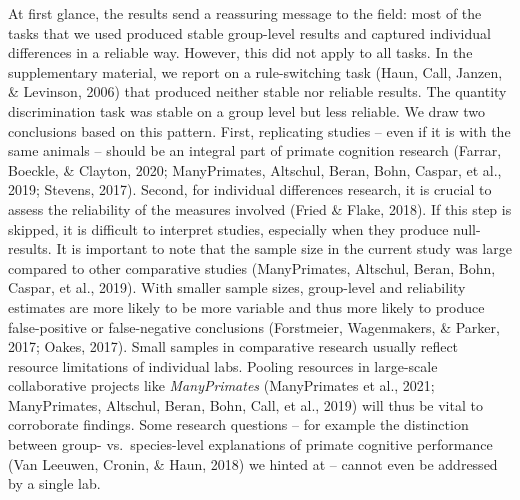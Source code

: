 \documentclass[
  man,floatsintext]{apa6}
\begin{document}
At first glance, the results send a reassuring message to the field: most of the tasks that we used produced stable group-level results and captured individual differences in a reliable way. However, this did not apply to all tasks. In the supplementary material, we report on a rule-switching task (Haun, Call, Janzen, \& Levinson, 2006) that produced neither stable nor reliable results. The quantity discrimination task was stable on a group level but less reliable. We draw two conclusions based on this pattern. First, replicating studies -- even if it is with the same animals -- should be an integral part of primate cognition research (Farrar, Boeckle, \& Clayton, 2020; ManyPrimates, Altschul, Beran, Bohn, Caspar, et al., 2019; Stevens, 2017). Second, for individual differences research, it is crucial to assess the reliability of the measures involved (Fried \& Flake, 2018). If this step is skipped, it is difficult to interpret studies, especially when they produce null-results. It is important to note that the sample size in the current study was large compared to other comparative studies (ManyPrimates, Altschul, Beran, Bohn, Caspar, et al., 2019). With smaller sample sizes, group-level and reliability estimates are more likely to be more variable and thus more likely to produce false-positive or false-negative conclusions (Forstmeier, Wagenmakers, \& Parker, 2017; Oakes, 2017). Small samples in comparative research usually reflect resource limitations of individual labs. Pooling resources in large-scale collaborative projects like \emph{ManyPrimates} (ManyPrimates et al., 2021; ManyPrimates, Altschul, Beran, Bohn, Call, et al., 2019) will thus be vital to corroborate findings. Some research questions -- for example the distinction between group- vs.~species-level explanations of primate cognitive performance (Van Leeuwen, Cronin, \& Haun, 2018) we hinted at -- cannot even be addressed by a single lab.
\end{document}
